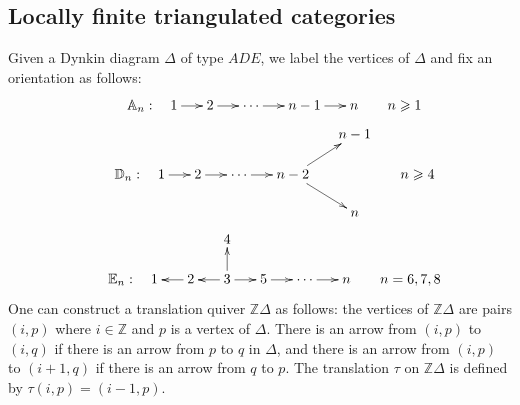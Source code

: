 \documentclass[12pt]{article}
\theoremstyle{plain}
\theoremstyle{definition}
\renewcommand{\geq}{\geqslant}
\begin{document}
 

\subsection{Locally finite triangulated categories}
\label{subsection-locally-finite}


Given a Dynkin diagram $\Delta$ of type $ADE$, we label the vertices of $\Delta$ and fix an orientation as follows:
$$\xymatrix@=1.5em{
& \mathbb{A}_n: \quad 1 \ar[r] & 2 \ar[r]&  \cdots \ar[r] &  \ar[r] n-1 &  n & n\geq 1
}$$
$$\xymatrix@=1.5em{
& & & &  & n-1\\
& \mathbb{D}_n: \quad 1 \ar[r] & 2 \ar[r]&  \cdots \ar[r] &  n-2\ar[ru]\ar[rd]  & & n\geq 4\\
& & & & &  n
}$$
$$\xymatrix@=1.5em{
& & &   4 \\
&  \mathbb{E}_n: \quad  1 & 2  \ar[l] & 3 \ar[l]\ar[r]\ar[u] &  5 \ar[r] &  \cdots \ar[r] & n & n=6,7,8
}$$
One can construct a translation quiver $\mathbb{Z}\Delta$ as follows: the vertices of $\mathbb{Z}\Delta$ are pairs $(i, p)$ where $i\in \mathbb{Z}$ and $p$ is a vertex of $\Delta$. There is an arrow from $(i, p)$ to $(i, q)$ if there is an arrow from $p$ to $q$ in $\Delta$, and there is an arrow from $(i, p)$ to $(i + 1, q)$ if  there is an arrow from $q$ to $p$. The translation $\tau$ on $\mathbb{Z}\Delta$ is defined by $\tau(i, p) = (i - 1, p)$.
\end{document}
